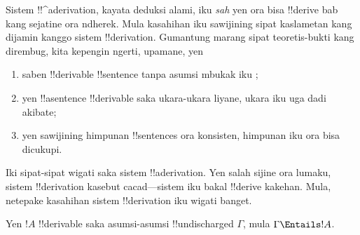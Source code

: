 \documentclass[../../../include/open-logic-section]{subfiles}
\begin{document}
      {}
      {}


\begin{explain}
Sistem !!^a{derivation}, kayata deduksi alami, iku \emph{sah} yen
ora bisa !!{derive} bab kang sejatine ora ndherek. Mula kasahihan iku
sawijining sipat kaslametan kang dijamin kanggo sistem
!!{derivation}. Gumantung marang sipat teoretis-bukti kang dirembug,
kita kepengin ngerti, upamane, yen
\begin{enumerate}
\item saben !!{derivable} !!{sentence} tanpa asumsi mbukak iku
  ;
\item yen !!a{sentence} !!{derivable} saka ukara-ukara liyane,
  ukara iku uga dadi akibate;
\item yen sawijining himpunan !!{sentence}s ora konsisten, himpunan
  iku ora bisa dicukupi.
\end{enumerate}
Iki sipat-sipat wigati saka sistem !!a{derivation}. Yen salah sijine
ora lumaku, sistem !!{derivation} kasebut cacad---sistem iku bakal
!!{derive} kakehan. Mula, netepake kasahihan sistem !!{derivation}
iku wigati banget. 
\end{explain}

\begin{thm}[Kasahihan]
Yen $!A$ !!{derivable} saka asumsi-asumsi !!{undischarged} $\Gamma$,
mula $\Gamma \Entails !A$.
\end{thm}
\end{document}
